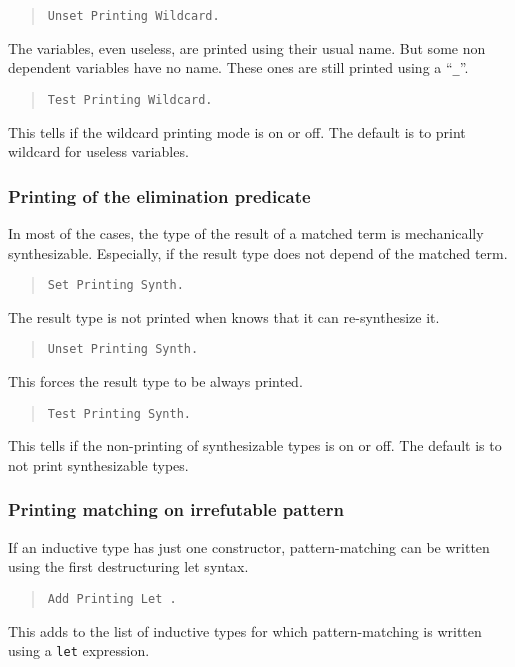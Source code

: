 \begin{quote}
{\tt Unset Printing Wildcard.}
\end{quote}
The variables, even useless, are printed using their usual name. But some
non dependent variables have no name. These ones are still printed
using a ``{\tt \_}''.

\begin{quote}
{\tt Test Printing Wildcard.}
\end{quote}
This tells if the wildcard printing mode is on or off. The default is
to print wildcard for useless variables.

\subsubsection{Printing of the elimination predicate
}

In most of the cases, the type of the result of a matched term is
mechanically synthesizable. Especially, if the result type does not
depend of the matched term.

\begin{quote}
{\tt Set Printing Synth.}
\end{quote}
The result type is not printed when {\Coq} knows that it can
re-synthesize it.

\begin{quote}
{\tt Unset Printing Synth.}
\end{quote}
This forces the result type to be always printed.

\begin{quote}
{\tt Test Printing Synth.}
\end{quote}
This tells if the non-printing of synthesizable types is on or off.
The default is to not print synthesizable types.

\subsubsection{Printing matching on irrefutable pattern
\label{AddPrintingLet}
}

If an inductive type has just one constructor,
pattern-matching can be written using the first destructuring let syntax.

\begin{quote}
{\tt Add Printing Let {\ident}.}
\end{quote}
This adds {\ident} to the list of inductive types for which
pattern-matching is written using a {\tt let} expression.


